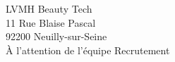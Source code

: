 
\begin{flushright}
LVMH Beauty Tech \\
11 Rue Blaise Pascal \\
92200 Neuilly-sur-Seine \\
À l’attention de l’équipe Recrutement
\end{flushright}